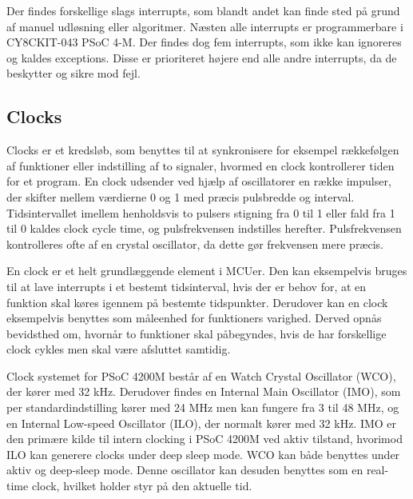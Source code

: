 Der findes forskellige slags interrupts, som blandt andet kan finde sted på grund af manuel udløsning eller algoritmer. Næsten alle interrupts er programmerbare i CY8CKIT-043 PSoC 4-M. Der findes dog fem interrupts, som ikke kan ignoreres og kaldes exceptions. Disse er prioriteret højere end alle andre interrupts, da de beskytter og sikre mod fejl. \citep{Badiger2016}

\subsection{Clocks}
Clocks er et kredsløb, som benyttes til at synkronisere for eksempel rækkefølgen af funktioner eller indstilling af to signaler, hvormed en clock kontrollerer tiden for et program. En clock udsender ved hjælp af oscillatorer en række impulser, der skifter mellem værdierne 0 og 1 med præcis pulsbredde og interval. Tidsintervallet imellem henholdsvis to pulsers stigning fra 0 til 1 eller fald fra 1 til 0 kaldes clock cycle time, og pulsfrekvensen indstilles herefter. Pulsfrekvensen kontrolleres ofte af en crystal oscillator, da dette gør frekvensen mere præcis. \citep{Tanenbaum2006}

En clock er et helt grundlæggende element i MCUer. Den kan eksempelvis bruges til at lave interrupts i et bestemt tidsinterval, hvis der er behov for, at en funktion skal køres igennem på bestemte tidspunkter. Derudover kan en clock eksempelvis benyttes som måleenhed for funktioners varighed. Derved opnås bevidsthed om, hvornår to funktioner skal påbegyndes, hvis de har forskellige clock cykles men skal være afsluttet samtidig. \citep{Tanenbaum2006}

Clock systemet for PSoC 4200M består af en Watch Crystal Oscillator (WCO), der kører med 32 kHz. Derudover findes en Internal Main Oscillator (IMO), som per standardindstilling kører med 24 MHz men kan fungere fra 3 til 48 MHz, og en Internal Low-speed Oscillator (ILO), der normalt kører med 32 kHz. IMO er den primære kilde til intern clocking i PSoC 4200M ved aktiv tilstand, hvorimod ILO kan generere clocks under deep sleep mode. WCO kan både benyttes under aktiv og deep-sleep mode. Denne oscillator kan desuden benyttes som en real-time clock, hvilket holder styr på den aktuelle tid. \citep{Semiconductor20164200M}

